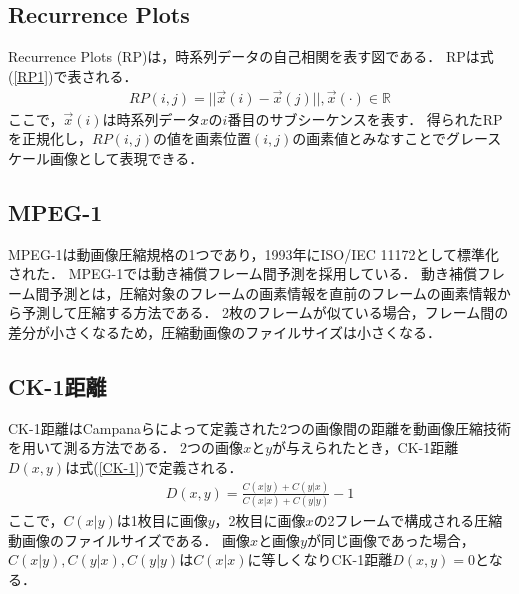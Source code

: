 \documentclass{interim} %
\begin{document}
\subsection{Recurrence Plots}
Recurrence Plots (RP)は，時系列データの自己相関を表す図である．
RPは式(\ref{RP1})で表される．
\begin{eqnarray}
\label{RP1}
RP(i,j)=||\vec{x}(i)-\vec{x}(j)||, \vec{x}(\cdot)\in\mathbb{R}
\end{eqnarray}
ここで，$\vec{x}(i)$は時系列データ$x$の$i$番目のサブシーケンスを表す．
得られたRPを正規化し，$RP(i,j)$の値を画素位置$(i,j)$の画素値とみなすことでグレースケール画像として表現できる．

\subsection{MPEG-1}
MPEG-1は動画像圧縮規格の1つであり，1993年にISO/IEC 11172として標準化された．
MPEG-1では動き補償フレーム間予測を採用している．
動き補償フレーム間予測とは，圧縮対象のフレームの画素情報を直前のフレームの画素情報から予測して圧縮する方法である．
2枚のフレームが似ている場合，フレーム間の差分が小さくなるため，圧縮動画像のファイルサイズは小さくなる．
\subsection{CK-1距離}
CK-1距離はCampanaらによって定義された2つの画像間の距離を動画像圧縮技術を用いて測る方法である\cite{ck1}．
2つの画像$x$と$y$が与えられたとき，CK-1距離$D(x,y)$は式(\ref{CK-1})で定義される．
\begin{eqnarray}
\label{CK-1}
D(x,y)=\frac{C(x|y)+C(y|x)}{C(x|x)+C(y|y)}-1
\end{eqnarray}
ここで，$C(x|y)$は1枚目に画像$y$，2枚目に画像$x$の2フレームで構成される圧縮動画像のファイルサイズである．
画像$x$と画像$y$が同じ画像であった場合，$C(x|y),C(y|x),C(y|y)$は$C(x|x)$に等しくなりCK-1距離$D(x,y)=0$となる．
\end{document}
